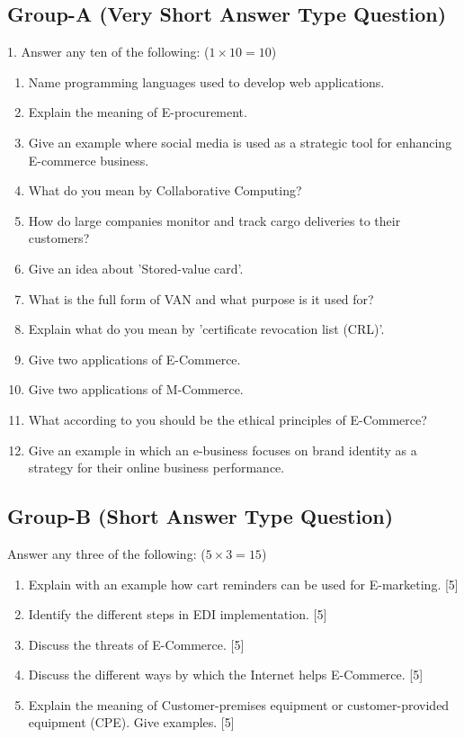 \subsection*{Group-A (Very Short Answer Type Question)}
1. Answer any ten of the following: ($1 \times 10 = 10$)
\begin{enumerate}
    \item[(I)] Name programming languages used to develop web applications.
    \item[(II)] Explain the meaning of E-procurement.
    \item[(III)] Give an example where social media is used as a strategic tool for enhancing E-commerce business.
    \item[(IV)] What do you mean by Collaborative Computing?
    \item[(V)] How do large companies monitor and track cargo deliveries to their customers?
    \item[(VI)] Give an idea about 'Stored-value card'.
    \item[(VII)] What is the full form of VAN and what purpose is it used for?
    \item[(VIII)] Explain what do you mean by 'certificate revocation list (CRL)'.
    \item[(IX)] Give two applications of E-Commerce.
    \item[(X)] Give two applications of M-Commerce.
    \item[(XI)] What according to you should be the ethical principles of E-Commerce?
    \item[(XII)] Give an example in which an e-business focuses on brand identity as a strategy for their online business performance.
\end{enumerate}

\subsection*{Group-B (Short Answer Type Question)}
Answer any three of the following: ($5 \times 3 = 15$)
\begin{enumerate}
    \item[2.] Explain with an example how cart reminders can be used for E-marketing. [5]
    \item[3.] Identify the different steps in EDI implementation. [5]
    \item[4.] Discuss the threats of E-Commerce. [5]
    \item[5.] Discuss the different ways by which the Internet helps E-Commerce. [5]
    \item[6.] Explain the meaning of Customer-premises equipment or customer-provided equipment (CPE). Give examples. [5]
\end{enumerate}

